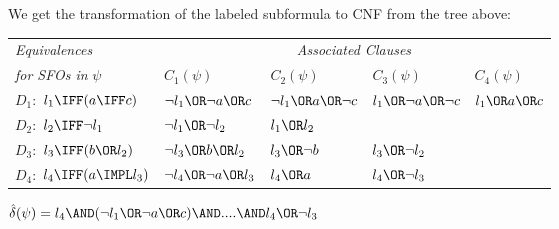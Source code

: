 {We get the transformation of the labeled subformula to CNF from the tree above:\\


\begin{tabular}{|l|l|l|l|l|}
\hline
\textsl{\small Equivalences} & \multicolumn{4}{c|}{\textsl{\small Associated
Clauses}} \\ 
{\small \textsl{for SFOs in} $\psi $} & $C_{1}(\psi )$ & $C_{2}(\psi )$ & $%
C_{3}(\psi )$  & $C_{4}(\psi )$ \\ \hline

$D_1:$ $l_{1}\IFF (a \IFF c)$ & $\lnot l_{1}\OR \lnot a \OR c$ & $\lnot l_{1} 
 \OR a \OR\lnot c$ & $l_{1} \OR\lnot a \OR\lnot c$ & $l_{1} \OR a \OR c$ \\
$D_2:$ $l_{2}\IFF\lnot l_{1}$ & $\lnot l_{1}\OR\lnot l_{2}$ & $l_{1}\OR l_{2}$ & & \\ 
$D_3:$ $l_{3}\IFF (b \OR l_{2})$ & $\lnot l_{3}\OR b \OR l_{2}$ & 
$l_{3}\OR\lnot b$ & $l_{3}\OR\lnot l_{2}$ &\\  
$D_4: $ $l_{4}\IFF (a\IMPL l_{3})$ & $\lnot l_{4}\OR\lnot a \OR l_{3}$ & 
$l_{4}\OR a$ & $l_{4}\OR\lnot l_{3}$ &\\ \hline
\end{tabular}
\label{tab:translation_cnf}

$\hat\delta (\psi) = l_{4} \AND (\lnot l_{1} \OR\lnot a \OR c) \AND .... \AND
l_{4} \OR\lnot l_{3}$
}